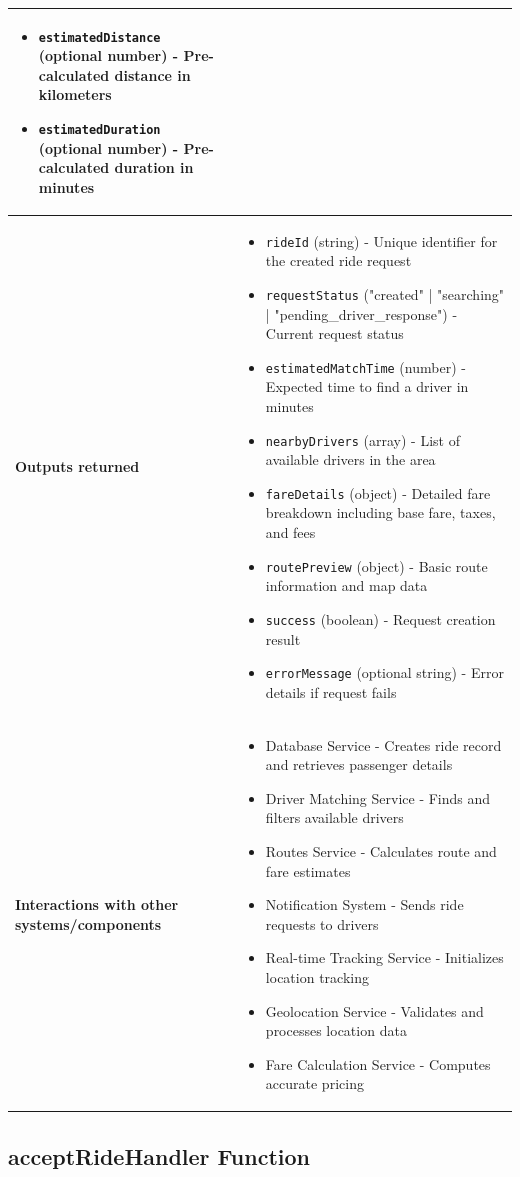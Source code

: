 \documentclass[11pt,a4paper]{article}
\begin{document}
\begin{longtable}{|p{3cm}|p{12cm}|}
\begin{itemize}[nosep]
\item \texttt{estimatedDistance} (optional number) - Pre-calculated distance in kilometers
\item \texttt{estimatedDuration} (optional number) - Pre-calculated duration in minutes
\end{itemize} \\
\hline
\textbf{Outputs returned} & 
\begin{itemize}[nosep]
\item \texttt{rideId} (string) - Unique identifier for the created ride request
\item \texttt{requestStatus} ("created" | "searching" | "pending\_driver\_response") - Current request status
\item \texttt{estimatedMatchTime} (number) - Expected time to find a driver in minutes
\item \texttt{nearbyDrivers} (array) - List of available drivers in the area
\item \texttt{fareDetails} (object) - Detailed fare breakdown including base fare, taxes, and fees
\item \texttt{routePreview} (object) - Basic route information and map data
\item \texttt{success} (boolean) - Request creation result
\item \texttt{errorMessage} (optional string) - Error details if request fails
\end{itemize} \\
\hline
\textbf{Interactions with other systems/components} & 
\begin{itemize}[nosep]
\item Database Service - Creates ride record and retrieves passenger details
\item Driver Matching Service - Finds and filters available drivers
\item Routes Service - Calculates route and fare estimates
\item Notification System - Sends ride requests to drivers
\item Real-time Tracking Service - Initializes location tracking
\item Geolocation Service - Validates and processes location data
\item Fare Calculation Service - Computes accurate pricing
\end{itemize} \\
\hline
\end{longtable}

\subsection{acceptRideHandler Function}
\end{document}

